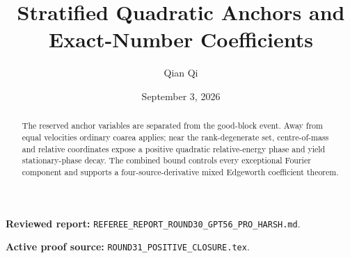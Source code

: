 \documentclass[11pt,reqno]{amsart}
\title[B1 Round 31 revision]{Stratified Quadratic Anchors and Exact-Number Coefficients}
\author{Qian Qi}
\date{September 3, 2026}
\begin{document}
\begin{abstract}
The reserved anchor variables are separated from the good-block event.  Away from equal velocities ordinary coarea applies; near the rank-degenerate set, centre-of-mass and relative coordinates expose a positive quadratic relative-energy phase and yield stationary-phase decay.  The combined bound controls every exceptional Fourier component and supports a four-source-derivative mixed Edgeworth coefficient theorem.
\end{abstract}
\maketitle
\noindent\textbf{Reviewed report:} \texttt{REFEREE\_REPORT\_ROUND30\_GPT56\_PRO\_HARSH.md}.\par
\noindent\textbf{Active proof source:} \texttt{ROUND31\_POSITIVE\_CLOSURE.tex}.\par

\end{document}

